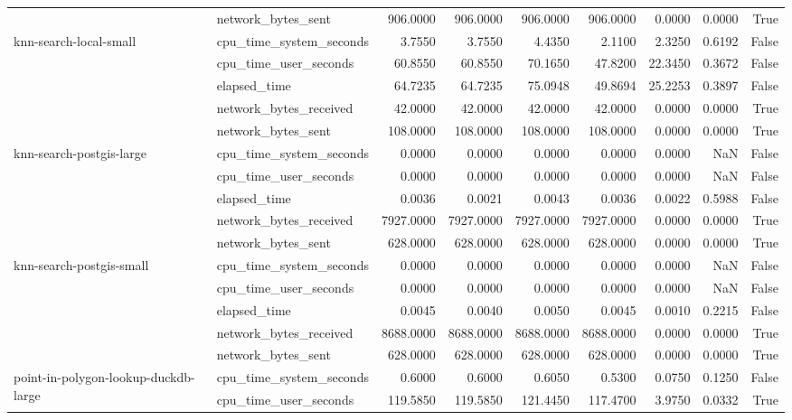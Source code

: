 \begin{tabular}{llrrrrrrr}
 & network\_bytes\_sent & 906.0000 & 906.0000 & 906.0000 & 906.0000 & 0.0000 & 0.0000 & True \\
\cline{1-9}
\multirow[t]{5}{*}{knn-search-local-small} & cpu\_time\_system\_seconds & 3.7550 & 3.7550 & 4.4350 & 2.1100 & 2.3250 & 0.6192 & False \\
 & cpu\_time\_user\_seconds & 60.8550 & 60.8550 & 70.1650 & 47.8200 & 22.3450 & 0.3672 & False \\
 & elapsed\_time & 64.7235 & 64.7235 & 75.0948 & 49.8694 & 25.2253 & 0.3897 & False \\
 & network\_bytes\_received & 42.0000 & 42.0000 & 42.0000 & 42.0000 & 0.0000 & 0.0000 & True \\
 & network\_bytes\_sent & 108.0000 & 108.0000 & 108.0000 & 108.0000 & 0.0000 & 0.0000 & True \\
\cline{1-9}
\multirow[t]{5}{*}{knn-search-postgis-large} & cpu\_time\_system\_seconds & 0.0000 & 0.0000 & 0.0000 & 0.0000 & 0.0000 & NaN & False \\
 & cpu\_time\_user\_seconds & 0.0000 & 0.0000 & 0.0000 & 0.0000 & 0.0000 & NaN & False \\
 & elapsed\_time & 0.0036 & 0.0021 & 0.0043 & 0.0036 & 0.0022 & 0.5988 & False \\
 & network\_bytes\_received & 7927.0000 & 7927.0000 & 7927.0000 & 7927.0000 & 0.0000 & 0.0000 & True \\
 & network\_bytes\_sent & 628.0000 & 628.0000 & 628.0000 & 628.0000 & 0.0000 & 0.0000 & True \\
\cline{1-9}
\multirow[t]{5}{*}{knn-search-postgis-small} & cpu\_time\_system\_seconds & 0.0000 & 0.0000 & 0.0000 & 0.0000 & 0.0000 & NaN & False \\
 & cpu\_time\_user\_seconds & 0.0000 & 0.0000 & 0.0000 & 0.0000 & 0.0000 & NaN & False \\
 & elapsed\_time & 0.0045 & 0.0040 & 0.0050 & 0.0045 & 0.0010 & 0.2215 & False \\
 & network\_bytes\_received & 8688.0000 & 8688.0000 & 8688.0000 & 8688.0000 & 0.0000 & 0.0000 & True \\
 & network\_bytes\_sent & 628.0000 & 628.0000 & 628.0000 & 628.0000 & 0.0000 & 0.0000 & True \\
\cline{1-9}
\multirow[t]{5}{*}{point-in-polygon-lookup-duckdb-large} & cpu\_time\_system\_seconds & 0.6000 & 0.6000 & 0.6050 & 0.5300 & 0.0750 & 0.1250 & False \\
 & cpu\_time\_user\_seconds & 119.5850 & 119.5850 & 121.4450 & 117.4700 & 3.9750 & 0.0332 & True \\

\end{tabular}
